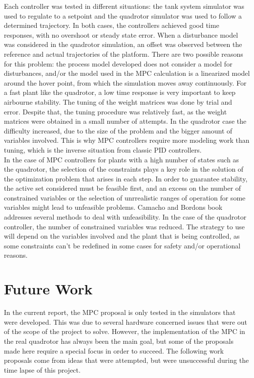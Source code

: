 Each controller was tested in different situations: the tank system simulator was used to regulate to a setpoint and the quadrotor simulator was used to follow a determined trajectory. In both cases, the controllers achieved good time responses, with no overshoot or steady state error. When a disturbance model was considered in the quadrotor simulation, an offset was observed between the reference and actual trajectories of the platform. There are two possible reasons for this problem: the process model developed does not consider a model for disturbances, and/or the model used in the MPC calculation is a linearized model around the hover point, from which the simulation moves away continuously. For a fast plant like the quadrotor, a low time response is very important to keep airbourne stability. The tuning of the weight matrices was done by trial and error. Despite that, the tuning procedure was relatively fast, as the weight matrices were obtained in a small number of attempts. In the quadrotor case the difficulty increased, due to the size of the problem and the bigger amount of variables involved. This is why MPC controllers require more modeling work than tuning, which is the inverse situation from classic PID controllers. \\

In the case of MPC controllers for plants with a high number of states such as the quadrotor, the selection of the constraints plays a key role in the solution of the optimization problem that arises in each step. In order to guarantee stability, the active set considered must be feasible first, and an excess on the number of constrained variables or the selection of unrrealistic ranges of operation for some variables might lead to unfeasible problems. Camacho and Bordons \cite{CamachoBordons} book addresses several methods to deal with unfeasibility. In the case of the quadrotor controller, the number of constrained variables was reduced. The strategy to use will depend on the variables involved and the plant that is being controlled, as some constraints can't be redefined in some cases for safety and/or operational reasons. \\


\section{Future Work}

In the current report, the MPC proposal is only tested in the simulators that were developed. This was due to several hardware concerned issues that were out of the scope of the project to solve. However, the implementation of the MPC in the real quadrotor has always been the main goal, but some of the proposals made here require a special focus in order to succeed. The following work proposals come from ideas that were attempted, but were unsuccessful during the time lapse of this project.\\

